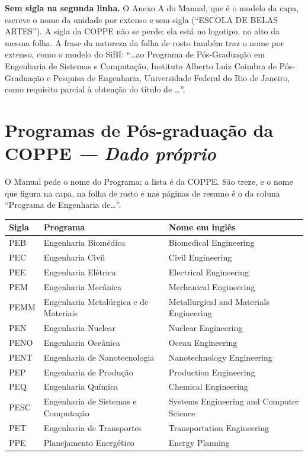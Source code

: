 \documentclass[a4paper,11pt]{article}
\newcommand\tipo[1]{\normalfont\textit{--- #1}}
\begin{document}
\textbf{Sem sigla na segunda linha.} O Anexo A do Manual, que é o modelo da
capa, escreve o nome da unidade por extenso e sem sigla (``ESCOLA DE BELAS
ARTES''). A sigla da COPPE não se perde: ela está no logotipo, no alto da mesma
folha. A frase da natureza da folha de rosto também traz o nome por extenso,
como o modelo do SiBI: ``\ldots ao Programa de Pós-Graduação em Engenharia de
Sistemas e Computação, Instituto Alberto Luiz Coimbra de Pós-Graduação e
Pesquisa de Engenharia, Universidade Federal do Rio de Janeiro, como requisito
parcial à obtenção do título de \ldots''.

\section{Programas de Pós-graduação da COPPE \tipo{Dado próprio}}

O Manual pede o nome do Programa; a lista é da COPPE. São treze, e o nome que
figura na capa, na folha de rosto e nas páginas de resumo é o da coluna
``Programa de Engenharia de\ldots''.

\begin{center}
\begin{tabular}{@{}llp{6.3cm}@{}}
\toprule
\textbf{Sigla} & \textbf{Programa} & \textbf{Nome em inglês}\\
\midrule
PEB  & Engenharia Biomédica                    & Biomedical Engineering\\
PEC  & Engenharia Civil                        & Civil Engineering\\
PEE  & Engenharia Elétrica                     & Electrical Engineering\\
PEM  & Engenharia Mecânica                     & Mechanical Engineering\\
PEMM & Engenharia Metalúrgica e de Materiais   & Metallurgical and Materials Engineering\\
PEN  & Engenharia Nuclear                      & Nuclear Engineering\\
PENO & Engenharia Oceânica                     & Ocean Engineering\\
PENT & Engenharia de Nanotecnologia            & Nanotechnology Engineering\\
PEP  & Engenharia de Produção                  & Production Engineering\\
PEQ  & Engenharia Química                      & Chemical Engineering\\
PESC & Engenharia de Sistemas e Computação     & Systems Engineering and Computer Science\\
PET  & Engenharia de Transportes               & Transportation Engineering\\
PPE  & Planejamento Energético                 & Energy Planning\\
\bottomrule
\end{tabular}
\end{center}
\end{document}
